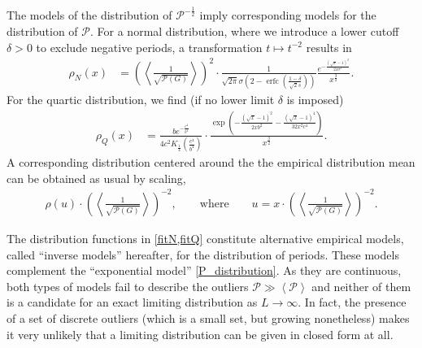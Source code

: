 \documentclass[11pt,a4paper]{article}
\newcommand{\period}{\mathcal P}
\renewcommand{\|}{\rule[-0.4ex]{0.2ex}{1.2em}}
\begin{document}
The models of the distribution of $\period^{-\frac 12}$ imply   corresponding models for the distribution of $\period$. For a normal distribution, where we introduce a lower cutoff $\delta >0$ to exclude negative periods,  a transformation $t \mapsto t^{-2}$ results in
\begin{align}\label{fitN}
	\rho_N(x) &=\left(\left \langle \frac{1}{\sqrt {\period (G)}} \right \rangle \right)^2\cdot  \frac{1}{\sqrt{2\pi} \sigma \left( 2-\operatorname{erfc}\left( \frac{1-\delta }{\sqrt 2 s} \right)   \right)  } \frac{e^{- \frac{\left( \sqrt x-1 \right) ^2}{2 x \sigma^2} }}{ x^{\frac 32}} .
\end{align}
For the quartic distribution, we find (if no lower limit  $\delta$ is imposed) 
\begin{align}\label{fitQ}
	\rho_Q(x) &= \frac{b e^{-\frac{c^4}{b^4}}}{4c^2 K_{\frac 14} \left( \frac{c^4}{b^4} \right)  } \cdot\frac{\exp \left( - \frac{(\sqrt x-1)^2}{2xb^2}  - \frac{(\sqrt x-1)^4}{32 x^2c^4} \right)}{x^{\frac 32}}.
\end{align}
A corresponding distribution centered around the the empirical distribution mean can be obtained as usual by scaling,
\begin{align}\label{fitQ_scaling}
	\rho(u)\cdot \left(\left \langle \frac{1}{\sqrt {\period (G)}} \right \rangle \right)^{-2} , \qquad \text{where} \qquad u= x\cdot  \left(\left \langle \frac{1}{\sqrt {\period (G)}} \right \rangle \right)^{-2} .
\end{align}

The distribution functions in  \cref{fitN,fitQ} constitute   alternative empirical models, called \enquote{inverse models} hereafter, for the distribution of periods. These models complement the \enquote{exponential model} \cref{P_distribution}. 
As they are continuous, both types of models fail to describe the outliers $\period \gg \left \langle \period \right \rangle $ and neither of them is a candidate for an exact limiting distribution as $L \rightarrow \infty$. In fact, the presence of a set of discrete outliers (which is a small set, but growing nonetheless) makes it very unlikely that a limiting distribution can be given in closed form at all.
\end{document}
